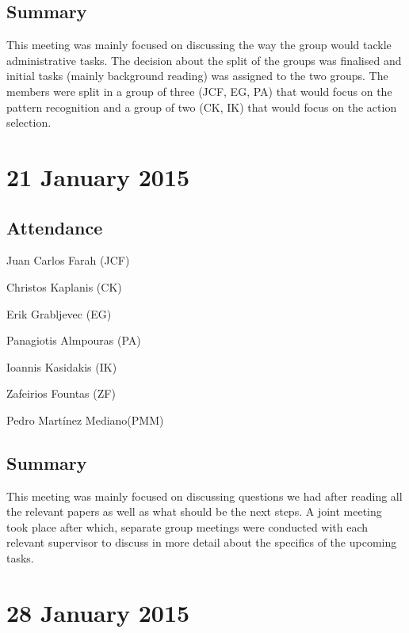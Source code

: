 \documentclass[a4paper,11pt]{article}
\begin{document}
\subsection*{Summary}
This meeting was mainly focused on discussing the way the group would tackle administrative tasks. The decision about the split of the groups was finalised and initial tasks (mainly background reading) was assigned to the two groups. The members were split in a group of three (JCF, EG, PA) that would focus on the pattern recognition and a group of two (CK, IK) that would focus on the action selection.

\maketitle
\section*{21 January 2015}
\subsection*{Attendance}
\begin{compactenum}
\item Juan Carlos Farah (JCF)
\item Christos Kaplanis (CK)
\item Erik Grabljevec (EG)
\item Panagiotis Almpouras (PA)
\item Ioannis Kasidakis (IK)
\item Zafeirios Fountas (ZF)
\item Pedro Martínez Mediano(PMM)
\end{compactenum}

\subsection*{Summary}
This meeting was mainly focused on discussing questions we had after reading all the relevant papers as well as what should be the next steps. A joint meeting took place after which, separate group meetings were conducted with each relevant supervisor to discuss in more detail about the specifics of the upcoming tasks.

\maketitle
\section*{28 January 2015}
\end{document}
